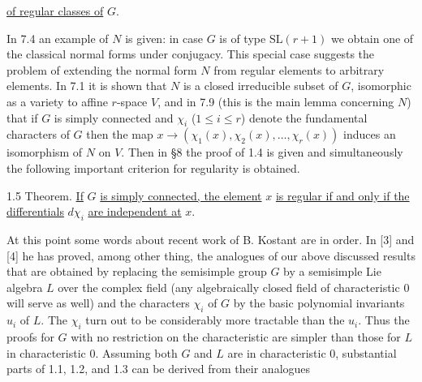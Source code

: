 
\uline{of regular classes of} $G$.

In 7.4 an example of $N$ is given: in case $G$ is of type $\mathrm{SL}(r+1)$ we obtain one of the classical normal forms under conjugacy. This special case suggests the problem of extending the normal form $N$ from regular elements to arbitrary elements. In 7.1 it is shown that $N$ is a closed irreducible subset of $G$, isomorphic as a variety to affine $r$-space $V$, and in 7.9 (this is the main lemma concerning $N$) that if $G$ is simply connected and $\chi_i$ ($1\leq i\leq r$) denote the fundamental characters of $G$ then the map $x\to(\chi_1(x),\chi_2(x),\ldots,\chi_r(x))$ induces an isomorphism of $N$ on $V$. Then in \S8 the proof of 1.4 is given and simultaneously the following important criterion for regularity is obtained.

1.5 Theorem. \uline{If} $G$ \uline{is simply connected, the element} $x$ \uline{is regular if and only if the differentials} $d\chi_i$ \uline{are independent at} $x$.

At this point some words about recent work of B. Kostant are in order. In [3] and [4] he has proved, among other thing, the analogues of our above discussed results that are obtained by replacing the semisimple group $G$ by a semisimple Lie algebra $L$ over the complex field (any algebraically closed field of characteristic $0$ will serve as well) and the characters $\chi_i$ of $G$ by the basic polynomial invariants $u_i$ of $L$. The $\chi_i$ turn out to be considerably more tractable than the $u_i$. Thus the proofs for $G$ with no restriction on the characteristic are simpler than those for $L$ in characteristic $0$. Assuming both $G$ and $L$ are in characteristic $0$, substantial parts of 1.1, 1.2, and 1.3 can be derived from their analogues

